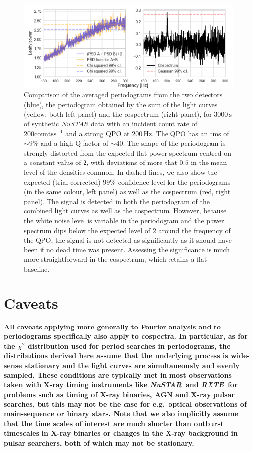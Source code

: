 \documentclass[12pt]{emulateapj}
\newcommand{\project}[1]{\textsl{#1}}
\newcommand{\nustar}{\project{NuSTAR}\xspace}
\newcommand{\rxte}{\project{RXTE}\xspace}
\begin{document}
\begin{figure}
\begin{center}
\includegraphics[width=\textwidth]{qpo.png}
\caption{Comparison of the averaged periodograms from the two detectors (blue), the periodogram obtained by the sum of the light curves (yellow; both left panel) and the cospectrum (right panel), for $3000\,\mathrm{s}$ of synthetic \nustar data with an incident count rate of $200 \mathrm{counts}\mathrm{s}^{-1}$ and a strong QPO at $200\,\mathrm{Hz}$. 
The QPO has an rms of $\sim$9\% and a high Q factor of $\sim$40. The shape of the periodogram is strongly distorted from the expected flat power spectrum centred on a constant value of $2$, with deviations of more that $0.5$ in the mean level of the densities common. In dashed lines, we also show the expected (trial-corrected) $99\%$ confidence level for the periodograms (in the same colour, left panel) as well as the cospectrum (red, right panel). The signal is detected in both the periodogram of the combined light curves as well as the cospectrum. However, because the white noise level is variable in the periodogram and the power spectrum dips below the expected level of $2$ around the frequency of the QPO, the signal is not detected as significantly as it should have been if no dead time was present. Assessing the significance is much more straightforward in the cospectrum, which retains a flat baseline.
}
\label{fig:qpo}
\end{center}
\end{figure}
\section{\textbf{Caveats}}

\textbf{All caveats applying more generally to Fourier analysis and to periodograms specifically also apply to cospectra. In particular, as for the $\chi^2$ distribution used for period searches in periodograms, the distributions derived here assume that the underlying process is wide-sense stationary and the light curves are simultaneously and evenly sampled. These conditions are typically met in most observations taken with X-ray timing instruments like \nustar\ and \rxte\ for problems such as timing of X-ray binaries, AGN and X-ray pulsar searches, but this may not be the case for e.g.\ optical observations of main-sequence or binary stars. Note that we also implicitly assume that the time scales of interest are much shorter than outburst timescales in X-ray binaries or changes in the X-ray background in pulsar searchers, both of which may not be stationary.}
\end{document}

